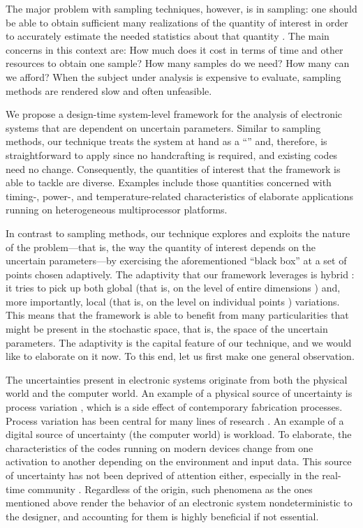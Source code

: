 The major problem with sampling techniques, however, is in sampling: one should
be able to obtain sufficient many realizations of the quantity of interest in
order to accurately estimate the needed statistics about that quantity
\cite{diaz-emparanza2002}. The main concerns in this context are: How much does
it cost in terms of time and other resources to obtain one sample? How many
samples do we need? How many can we afford? When the subject under analysis is
expensive to evaluate, sampling methods are rendered slow and often unfeasible.

We propose a design-time system-level framework for the analysis of electronic
systems that are dependent on uncertain parameters. Similar to sampling methods,
our technique treats the system at hand as a ``'' and,
therefore, is straightforward to apply since no handcrafting is required, and
existing codes need no change. Consequently, the quantities of interest that the
framework is able to tackle are diverse. Examples include those quantities
concerned with timing-, power-, and temperature-related characteristics of
elaborate applications running on heterogeneous multiprocessor platforms.

In contrast to sampling methods, our technique explores and exploits the nature
of the problem---that is, the way the quantity of interest depends on the
uncertain parameters---by exercising the aforementioned ``black box'' at a set
of points chosen adaptively. The adaptivity that our framework leverages is
hybrid \cite{jakeman2012}: it tries to pick up both global (that is, on the
level of entire dimensions \cite{klimke2006}) and, more importantly, local (that
is, on the level on individual points \cite{ma2009}) variations. This means that
the framework is able to benefit from many particularities that might be present
in the stochastic space, that is, the space of the uncertain parameters. The
adaptivity is the capital feature of our technique, and we would like to
elaborate on it now. To this end, let us first make one general observation.

The uncertainties present in electronic systems originate from both the physical
world and the computer world. An example of a physical source of uncertainty is
process variation \cite{srivastava2005}, which is a side effect of contemporary
fabrication processes. Process variation has been central for many lines of
research \cite{bhardwaj2008, juan2012, lee2013, ukhov2014, ukhov2015}. An
example of a digital source of uncertainty (the computer world) is workload. To
elaborate, the characteristics of the codes running on modern devices change
from one activation to another depending on the environment and input data. This
source of uncertainty has not been deprived of attention either, especially in
the real-time community \cite{quinton2012, diaz2002, santinelli2011,
tanasa2015}. Regardless of the origin, such phenomena as the ones mentioned
above render the behavior of an electronic system nondeterministic to the
designer, and accounting for them is highly beneficial if not essential.

